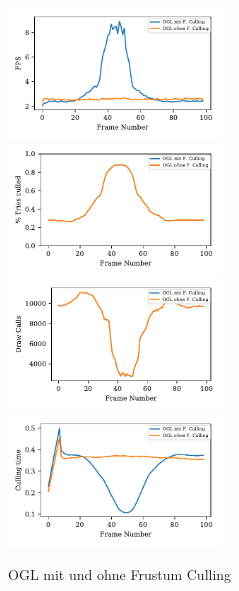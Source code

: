 \documentclass[journal]{vgtc}
\begin{document}
\begin{figure}
	\begin{minipage}{0.5\textwidth}
		\includegraphics[width=0.5\textwidth]{images/Evaluation_5_Results_FPS.pdf}
		\includegraphics[width=0.5\textwidth]{images/Evaluation_5_Results_Percentage culled.pdf}
		\includegraphics[width=0.5\textwidth]{images/Evaluation_5_Results_Draw Calls.pdf}
		\includegraphics[width=0.5\textwidth]{images/Evaluation_5_Results_Culling time.pdf}
		\caption{OGL mit und ohne Frustum Culling}
		\label{fig:performance_frustum}
	\end{minipage}
\end{figure}
\end{document}
